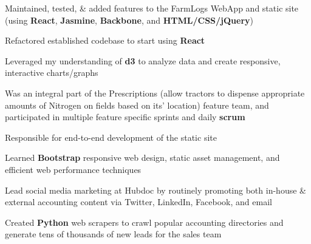 \documentclass[letterpaper]{deedy-resume} %
\begin{document}
\begin{minipage}[t]{0.66\textwidth}

  \begin{tightitemize}
  \item Maintained, tested, \& added features to the FarmLogs WebApp and static site (using \textbf{React}, \textbf{Jasmine}, \textbf{Backbone}, and \textbf{HTML/CSS/jQuery})
  \item Refactored established codebase to start using \textbf{React}
  \item Leveraged my understanding of \textbf{d3} to analyze data and create responsive, interactive charts/graphs
  \item Was an integral part of the Prescriptions (allow tractors to dispense appropriate amounts of Nitrogen on fields based on its' location) feature team, and participated in multiple feature specific sprints and daily \textbf{scrum}
  \end{tightitemize}

  \sectionspace %



  \begin{tightitemize}
  \item Responsible for end-to-end development of the static site
  \item Learned \textbf{Bootstrap} responsive web design, static asset management, and efficient web performance techniques
  \item Lead social media marketing at Hubdoc by routinely promoting both in-house \& external accounting content via Twitter, LinkedIn, Facebook, and email
  \item Created \textbf{Python} web scrapers to crawl popular accounting directories and generate tens of thousands of new leads for the sales team
  \end{tightitemize}

  \sectionspace %
  

\end{minipage}
\end{document}
